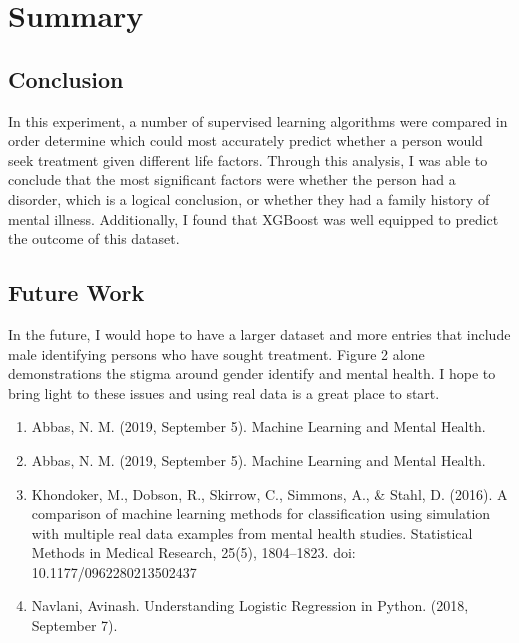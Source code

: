 \documentclass{article}
\begin{document}
\section{Summary}
\subsection{Conclusion} 
In this experiment, a number of supervised learning algorithms were compared in order determine which could most accurately predict whether a person would seek treatment given different life factors. Through this analysis, I was able to conclude that the most significant factors were whether the person had a disorder, which is a logical conclusion, or whether they had a family history of mental illness. Additionally, I found that XGBoost was well equipped to predict the outcome of this dataset.
\subsection{Future Work} 
In the future, I would hope to have a larger dataset and more entries that include male identifying persons who have sought treatment. Figure 2 alone demonstrations the stigma around gender identify and mental health. I hope to bring light to these issues and using real data is a great place to start.



\begin{enumerate}
	\item Abbas, N. M. (2019, September 5). Machine Learning and Mental Health. 
	\item Abbas, N. M. (2019, September 5). Machine Learning and Mental Health. 
	\item Khondoker, M., Dobson, R., Skirrow, C., Simmons, A., & Stahl, D. (2016). A comparison of machine learning methods for classification using simulation with multiple real data examples from mental health studies. Statistical Methods in Medical Research, 25(5), 1804–1823. doi: 10.1177/0962280213502437
	\item Navlani, Avinash. Understanding Logistic Regression in Python. (2018, September 7). 
\end{enumerate}
\end{document}
